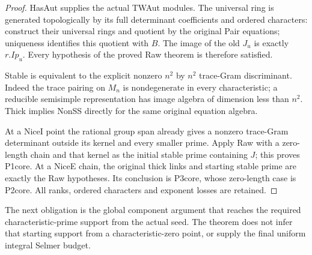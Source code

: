 \begin{proof}
HasAut supplies the actual TWAut modules.  The universal ring is
generated topologically by its full determinant coefficients and
ordered characters: construct their universal rings and quotient by
the original Pair equations; uniqueness identifies this quotient
with $B$.  The image of the old $J_u$ is exactly $r.Ip_u$.
Every hypothesis of the proved Raw theorem is therefore satisfied.

Stable is equivalent to the explicit nonzero $n^2$ by $n^2$ trace-Gram
discriminant.  Indeed the trace pairing on $M_n$ is nondegenerate in
every characteristic; a reducible semisimple representation has image
algebra of dimension less than $n^2$.  Thick implies NonSS directly
for the same original equation algebra.

At a NiceI point the rational group span already gives a nonzero
trace-Gram determinant outside its kernel and every smaller prime.
Apply Raw with a zero-length chain and that kernel as the initial
stable prime containing $J$; this proves P1core.  At a NiceE chain,
the original thick links and starting stable prime are exactly the
Raw hypotheses.  Its conclusion is P3core, whose zero-length case is
P2core.  All ranks, ordered characters and exponent losses are retained.
\end{proof}

The next obligation is the global component argument that reaches the
required characteristic-prime support from the actual seed.  The
theorem does not infer that starting support from a characteristic-zero
point, or supply the final uniform integral Selmer budget.
